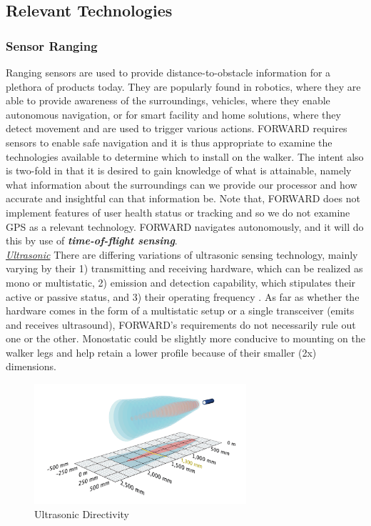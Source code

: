 \subsection{Relevant Technologies}

\subsubsection{Sensor Ranging}
\noindent Ranging sensors are used to provide distance-to-obstacle information for a plethora of products today. They are popularly found in robotics, where they are able to provide awareness of the surroundings, vehicles, where they enable autonomous navigation, or for smart facility and home solutions, where they detect movement and are used to trigger various actions. FORWARD requires sensors to enable safe navigation and it is thus appropriate to examine the technologies available to determine which to install on the walker. The intent also is two-fold in that it is desired to gain knowledge of what is attainable, namely what information about the surroundings can we provide our processor and how accurate and insightful can that information be. Note that, FORWARD does not implement features of user health status or tracking and so we do not examine GPS as a relevant technology. FORWARD navigates autonomously, and it will do this by use of \textbf{\textit{time-of-flight sensing}}.\\

\noindent \underline{\textit{Ultrasonic}} There are differing variations of ultrasonic sensing technology, mainly varying by their 1) transmitting and receiving hardware, which can be realized as mono or multistatic, 2) emission and detection capability, which stipulates their active or passive status, and 3) their operating frequency \cite{sonar-type}. As far as whether the hardware comes in the form of a multistatic setup or a single transceiver (emits and receives ultrasound), FORWARD's requirements do not necessarily rule out one or the other. Monostatic could be slightly more conducive to mounting on the walker legs and help retain a lower profile because of their smaller (2x) dimensions.\\

\begin{figure}[H]
	\centering
	\includegraphics[width=0.7\textwidth]{./Images/cool-ultrasonic-directivity.png}
	\caption{\label{fig:cool-directivity}Ultrasonic Directivity \cite{coolUltraDirect}}
\end{figure}


